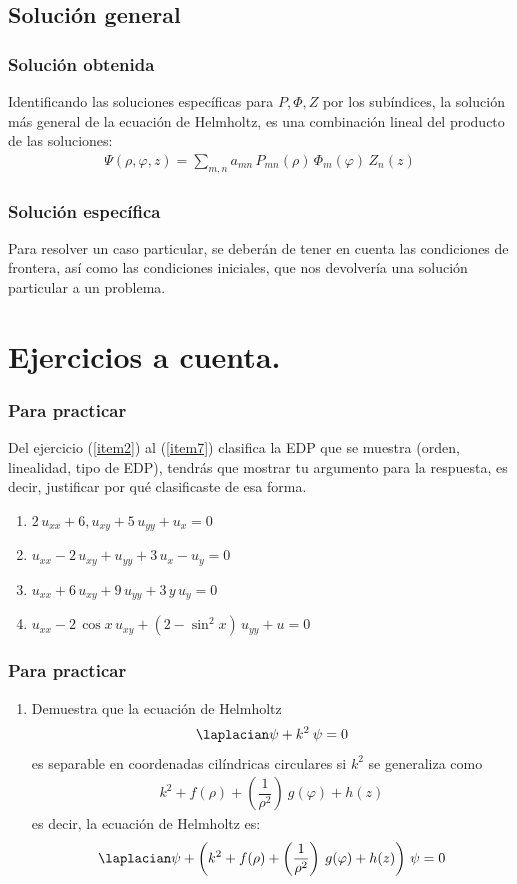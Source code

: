 \subsection{Solución general}
\begin{frame}
\frametitle{Solución obtenida}
Identificando las soluciones específicas para $P, \Phi, Z$ por los subíndices, la solución más general de la ecuación de Helmholtz, es una combinación lineal del producto de las soluciones:
\begin{align}
\Psi (\rho, \varphi, z) =  \sum_{m,n} a_{mn} \, P_{mn}(\rho) \, \Phi_{m}(\varphi) \, Z_{n}(z)
\label{eq:ecuacion_09_56}
\end{align}
\end{frame}
\begin{frame}
\frametitle{Solución específica}
Para resolver un caso particular, se deberán de tener en cuenta las condiciones de frontera, así como las condiciones iniciales, que nos devolvería una solución particular a un problema.
\end{frame}
\section{Ejercicios a cuenta.}
\begin{frame}
\frametitle{Para practicar}
Del ejercicio (\ref{item2}) al (\ref{item7}) clasifica la EDP que se muestra (orden, linealidad, tipo de EDP), tendrás que mostrar tu argumento para la respuesta, es decir, justificar por qué clasificaste de esa forma.
\begin{enumerate}
\item $2 \, u_{xx} + 6 , u_{xy} + 5 \, u_{yy} + u_{x} = 0$ \label{item2}
\item $u_{xx} - 2 \, u_{xy} + u_{yy} + 3 \, u_{x} - u_{y} = 0$ \label{item3}
\item $u_{xx} + 6 \, u_{xy} + 9 \, u_{yy} + 3 \, y \, u_{y} = 0$ \label{item5}
\item $u_{xx} - 2 \, \cos x \, u_{xy} +  (2 - \sin^{2} x) \, u_{yy} + u = 0$ \label{item7}
\seti
\end{enumerate}
\end{frame}
\begin{frame}
\frametitle{Para practicar}
\begin{enumerate}
\conti
\item Demuestra que la ecuación de Helmholtz
\begin{align*}
\laplacian \psi + k^{2} \: \psi = 0
\end{align*}
es separable en coordenadas cilíndricas circulares si $k^{2}$ se generaliza como
\begin{align*}
k^{2} + f(\rho) + \left( \dfrac{1}{\rho^{2}} \right) \: g(\varphi) + h(z)
\end{align*}
es decir, la ecuación de Helmholtz es:
\begin{align*}
\laplacian \psi + \left( k^{2} + f(\rho) + \left( \dfrac{1}{\rho^{2}} \right) \: g(\varphi) + h(z) \right) \, \psi = 0
\end{align*}
\end{enumerate}
\end{frame}
